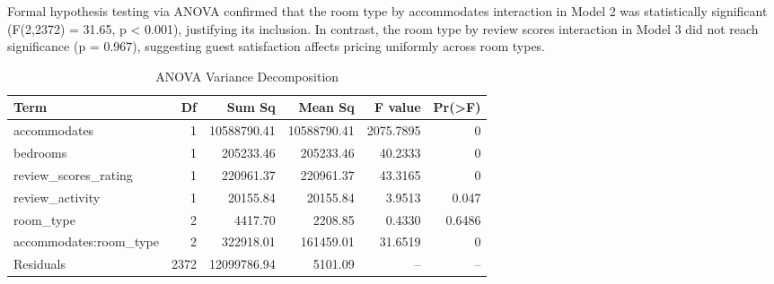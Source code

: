 \documentclass[9pt,a4paper,onecolumn,twoside]{tau-class/tau}
\begin{document}
Formal hypothesis testing via ANOVA confirmed that the room type by accommodates interaction in Model 2 was statistically significant (F(2,2372) = 31.65, p < 0.001), justifying its inclusion. In contrast, the room type by review scores interaction in Model 3 did not reach significance (p = 0.967), suggesting guest satisfaction affects pricing uniformly across room types.

\begin{table}[htbp]
\centering
\caption{ANOVA Variance Decomposition}
\label{tab:anova}
\begin{tabular}{lrrrrr}
\hline
Term & Df & Sum Sq & Mean Sq & F value & Pr(>F) \\
\hline
accommodates              &    1 & 10588790.41 & 10588790.41 & 2075.7895 & 0      \\
bedrooms                  &    1 &   205233.46 &   205233.46 &   40.2333 & 0      \\
review\_scores\_rating    &    1 &   220961.37 &   220961.37 &   43.3165 & 0      \\
review\_activity          &    1 &    20155.84 &    20155.84 &    3.9513 & 0.047  \\
room\_type                &    2 &     4417.70 &     2208.85 &    0.4330 & 0.6486 \\
accommodates:room\_type   &    2 &   322918.01 &   161459.01 &   31.6519 & 0      \\
Residuals                 & 2372 & 12099786.94 &     5101.09 &        -- & --     \\
\hline
\end{tabular}
\end{table}
\end{document}
